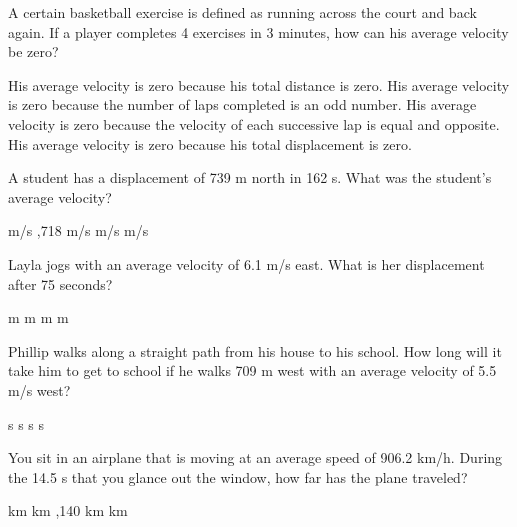 \documentclass[]{exam}
\begin{document}
\begin{questions}
\clearpage





\question %
A certain basketball exercise is defined as running across the court and back again. If a player completes 4 exercises in 3 minutes, how can his average velocity be zero?
\begin{choices}
\choice His average velocity is zero because his total distance is zero.
\choice His average velocity is zero because the number of laps completed is an odd number.
\choice His average velocity is zero because the velocity of each successive lap is equal and opposite.
\CorrectChoice His average velocity is zero because his total displacement is zero.
\end{choices}

\question %
A student has a displacement of 739 m north in 162 s. What was the student's average velocity?

\begin{choices}
 m/s
,718 m/s
 m/s
 m/s
\end{choices}

\question %
Layla jogs with an average velocity of 6.1 m/s east. What is her displacement after 75 seconds?

\begin{choices}
 m
 m
 m
 m
\end{choices}

\question %
Phillip walks along a straight path from his house to his school. How long will it take him to get to school if he walks 709 m west with an average velocity of 5.5 m/s west?


\begin{choices}
 s
 s
 s
 s
\end{choices}



\question %
You sit in an airplane that is moving at an average speed of 906.2 km/h. During the 14.5 s that you glance out the window, how far has the plane traveled?

\begin{choices}
 km
 km
,140 km
 km
\end{choices}






\end{questions}
\end{document}
